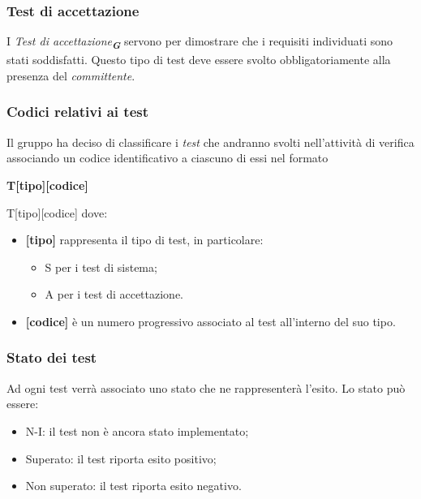 \subsubsection{Test di accettazione}
I \emph{Test di accettazione}\textsubscript{\textit{\textbf{G}}} servono per dimostrare che i requisiti individuati sono stati
soddisfatti. Questo tipo di test deve essere svolto obbligatoriamente alla presenza del \emph{committente}.

\subsubsection{Codici relativi ai test}
Il gruppo ha deciso di classificare i \emph{test} che andranno svolti nell’attività di verifica associando un codice identificativo a ciascuno di essi nel formato
\begin{center}
    \textbf{T[tipo][codice]}
\end{center}T[tipo][codice]
dove:
\begin{itemize}
    \item \textbf{[tipo]} rappresenta il tipo di test, in particolare:
    \begin{itemize}
        \item S per i test di sistema;
        \item A per i test di accettazione.
    \end{itemize}
    \item \textbf{[codice]} è un numero progressivo associato al test all’interno del suo tipo.
\end{itemize}


\subsubsection{Stato dei test}
Ad ogni test verrà associato uno stato che ne rappresenterà l’esito.
Lo stato può essere:
\begin{itemize}
    \item N-I: il test non è ancora stato implementato;
    \item Superato: il test riporta esito positivo;
    \item Non superato: il test riporta esito negativo.
\end{itemize}

